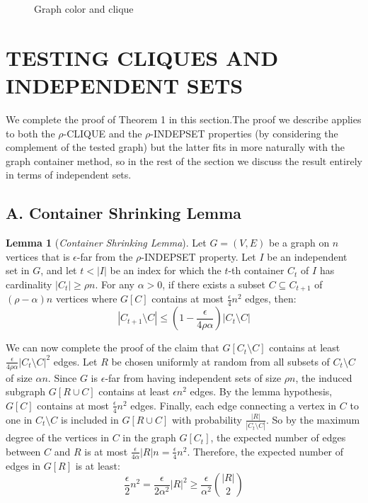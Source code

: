 \documentclass[preprint,11pt]{elsarticle}
\theoremstyle{definition}
\newtheorem{lemma}[theorem]{Lemma}
\begin{document}
\begin{multicols}{2}
\begin{figure}[t]
    \caption{Graph color and clique}
    \label{fig:example-image}\cite{quanta_image}
\end{figure}
\section{TESTING CLIQUES AND INDEPENDENT SETS}                      
 We complete the proof of Theorem 1 in this section.The proof we describe applies to both the $\rho$-CLIQUE and the $\rho$-INDEPSET properties (by considering the complement of the
tested graph) but the latter fits in more naturally with the graph
container method, so in the rest of the section we discuss the
result entirely in terms of independent sets.
\subsection*{A. Container Shrinking Lemma}
\begin{lemma}[\textit{Container Shrinking Lemma}]
Let \( G = (V, E) \) be a graph on \( n \) vertices that is \(\epsilon\)-far from the \(\rho\)-INDEPSET property. Let \( I \) be an independent set in \( G \), and let \( t < |I| \) be an index for which the \( t \)-th container \( C_t \) of \( I \) has cardinality \( |C_t| \geq \rho n \). For any \(\alpha > 0\), if there exists a subset \( C \subseteq C_{t+1} \) of \( (\rho - \alpha)n \) vertices where \( G[C] \) contains at most \( \frac{\epsilon}{4} n^2 \) edges, then:
\begin{equation*}
|C_{t+1} \setminus C| \leq \left( 1 - \frac{\epsilon}{4 \rho \alpha} \right) |C_t \setminus C|
\end{equation*}
 
 We can now complete the proof of the claim that \( G[C_t \setminus C] \) contains at least \( \frac{\epsilon}{4 \rho \alpha} |C_t \setminus C|^2 \) edges.
Let \( R \) be chosen uniformly at random from all subsets of \( C_t \setminus C \) of size \( \alpha n \). Since \( G \) is \(\epsilon\)-far from having independent sets of size \( \rho n \), the induced subgraph \( G[R \cup C] \) contains at least \( \epsilon n^2 \) edges. By the lemma hypothesis, \( G[C] \) contains at most \( \frac{\epsilon}{4} n^2 \) edges. 
Finally, each edge connecting a vertex in \( C \) to one in \( C_t \setminus C \) is included in \( G[R \cup C] \) with probability \( \frac{|R|}{|C_t \setminus C|} \). So by the maximum degree of the vertices in \( C \) in the graph \( G[C_t] \), the expected number of edges between \( C \) and \( R \) is at most \( \frac{\epsilon}{4 \alpha} |R| n = \frac{\epsilon}{4} n^2 \). 
Therefore, the expected number of edges in \( G[R] \) is at least:
\begin{equation*}
\frac{\epsilon}{2} n^2 = \frac{\epsilon}{2 \alpha^2} |R|^2 \geq \frac{\epsilon}{\alpha^2} \binom{|R|}{2}
\end{equation*} 
\end{lemma}

\end{multicols}
\end{document}
